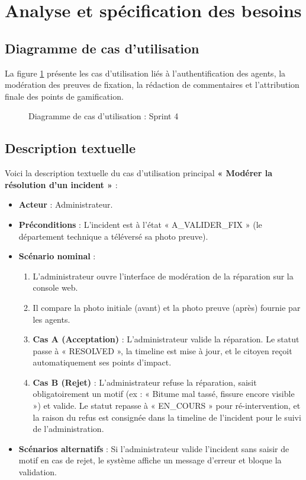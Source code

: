 \section{Analyse et spécification des besoins}

\subsection{Diagramme de cas d'utilisation}
La figure \ref{fig:uc_sprint4} présente les cas d'utilisation liés à l'authentification des agents, la modération des preuves de fixation, la rédaction de commentaires et l'attribution finale des points de gamification.

\begin{figure}[H]
    \centering
    \caption{Diagramme de cas d'utilisation : Sprint 4}
    \label{fig:uc_sprint4}
\end{figure}

\subsection{Description textuelle}
Voici la description textuelle du cas d'utilisation principal \textbf{« Modérer la résolution d'un incident »} :
\begin{itemize}
    \item \textbf{Acteur} : Administrateur.
    \item \textbf{Préconditions} : L'incident est à l'état « A\_VALIDER\_FIX » (le département technique a téléversé sa photo preuve).
    \item \textbf{Scénario nominal} :
    \begin{enumerate}
        \item L'administrateur ouvre l'interface de modération de la réparation sur la console web.
        \item Il compare la photo initiale (avant) et la photo preuve (après) fournie par les agents.
        \item \textbf{Cas A (Acceptation)} : L'administrateur valide la réparation. Le statut passe à « RESOLVED », la timeline est mise à jour, et le citoyen reçoit automatiquement ses points d'impact.
        \item \textbf{Cas B (Rejet)} : L'administrateur refuse la réparation, saisit obligatoirement un motif (ex : « Bitume mal tassé, fissure encore visible ») et valide. Le statut repasse à « EN\_COURS » pour ré-intervention, et la raison du refus est consignée dans la timeline de l'incident pour le suivi de l'administration.
    \end{enumerate}
    \item \textbf{Scénarios alternatifs} : Si l'administrateur valide l'incident sans saisir de motif en cas de rejet, le système affiche un message d'erreur et bloque la validation.
\end{itemize}

